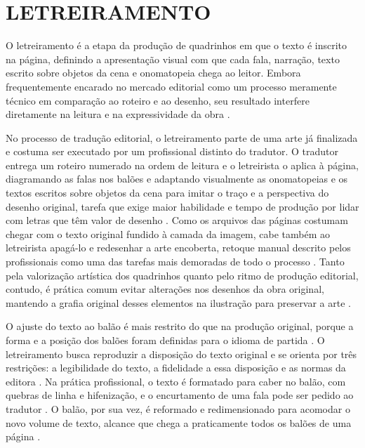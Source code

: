 \documentclass[
    12pt,
    openright,
    oneside,
    a4paper,
    chapter=TITLE,
    section=TITLE,
    english,
    brazilian,
    brazil
]{abntex2}
\begin{document}
\section{LETREIRAMENTO}
\label{sec:letreiramento}

O letreiramento é a etapa da produção de quadrinhos em que o texto é inscrito na página, definindo a apresentação visual com que cada fala, narração, texto escrito sobre objetos da cena e onomatopeia chega ao leitor. Embora frequentemente encarado no mercado editorial como um processo meramente técnico em comparação ao roteiro e ao desenho, seu resultado interfere diretamente na leitura e na expressividade da obra \cite{assis2015letterer}.

No processo de tradução editorial, o letreiramento parte de uma arte já finalizada e costuma ser executado por um profissional distinto do tradutor. O tradutor entrega um roteiro numerado na ordem de leitura e o letreirista o aplica à página, diagramando as falas nos balões e adaptando visualmente as onomatopeias e os textos escritos sobre objetos da cena para imitar o traço e a perspectiva do desenho original, tarefa que exige maior habilidade e tempo de produção por lidar com letras que têm valor de desenho \cite{assis2016especificidades, assis2018aprox, linsley2020letterer}. Como os arquivos das páginas costumam chegar com o texto original fundido à camada da imagem, cabe também ao letreirista apagá-lo e redesenhar a arte encoberta, retoque manual descrito pelos profissionais como uma das tarefas mais demoradas de todo o processo \cite{gizmodo2025letterer, linsley2021jenten}. Tanto pela valorização artística dos quadrinhos quanto pelo ritmo de produção editorial, contudo, é prática comum evitar alterações nos desenhos da obra original, mantendo a grafia original desses elementos na ilustração para preservar a arte \cite{assis2016especificidades, leitao2010estrategias}.

O ajuste do texto ao balão é mais restrito do que na produção original, porque a forma e a posição dos balões foram definidas para o idioma de partida \cite{jones2020mangalettering}. O letreiramento busca reproduzir a disposição do texto original \cite{linsley2021jenten} e se orienta por três restrições: a legibilidade do texto, a fidelidade a essa disposição e as normas da editora \cite{bovia2019lettering}. Na prática profissional, o texto é formatado para caber no balão, com quebras de linha e hifenização, e o encurtamento de uma fala pode ser pedido ao tradutor \cite{jones2020mangalettering}. O balão, por sua vez, é reformado e redimensionado para acomodar o novo volume de texto, alcance que chega a praticamente todos os balões de uma página \cite{piekos-hand-lettering, klein2021interview}.
\end{document}
